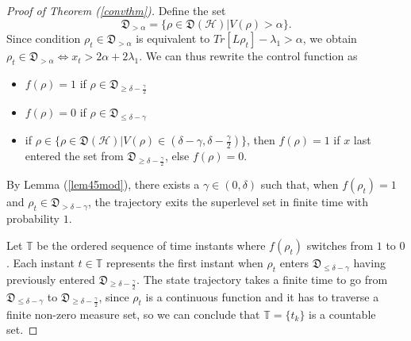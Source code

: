 \documentclass[conference]{IEEEtran}
\theoremstyle{plain}
\theoremstyle{plain}
\theoremstyle{plain}
\theoremstyle{plain}
\theoremstyle{remark}
\theoremstyle{definition}
\begin{document}
\begin{proof}[Proof of Theorem (\ref{convthm})]
    {Define the set \begin{equation}
        \mathfrak D_{> \alpha} = \{\rho \in \mathfrak{D}(\mathcal H) | V(\rho) > \alpha\}.
    \end{equation} Since condition $\rho_t \in \mathfrak D_{> \alpha}$ is equivalent to $Tr[L\rho_t] - \lambda_1 > \alpha$,  we obtain
\(
        \rho_t \in \mathfrak D_{> \alpha} \iff x_t > 2\alpha + 2\lambda_1.
 \)
     We can thus rewrite the control function as \begin{itemize}
        \item $f(\rho) = 1$ if $\rho \in \mathfrak D_{\ge \delta - \frac{\gamma}{2}}$
        \item $f(\rho) = 0$ if $\rho \in \mathfrak D_{\le \delta - \gamma}$
        \item if $\rho \in \{\rho \in \mathfrak D(\mathcal H) | V(\rho) \in (\delta - \gamma, \delta - \frac{\gamma}{2})\}$, then $f(\rho) = 1$ if $x$ last entered the set from $\mathfrak D_{\ge \delta - \frac{\gamma}{2}}$, else $f(\rho) = 0$.
    \end{itemize}}

    By Lemma (\ref{lem45mod}), there exists a $\gamma \in (0, \delta)$ such that, when $f(\rho_t) = 1$ and $\rho_t \in \mathfrak D_{> \delta - \gamma}$, the trajectory exits the superlevel set in finite time with probability $1$.

    Let $\mathbb T$ be the ordered sequence of time instants where $f(\rho_t)$ switches from $1$ to $0$. Each instant $t \in \mathbb T$ represents the first instant when $\rho_t$ enters $\mathfrak D_{\le \delta - \gamma}$ having previously entered $\mathfrak D_{\ge \delta - \frac{\gamma}{2}}$. The state trajectory takes a finite time to go from $\mathfrak D_{\le \delta - \gamma}$ to $\mathfrak D_{\ge \delta - \frac{\gamma}{2}}$, since $\rho_t$ is a continuous function and it has to traverse a finite non-zero measure set, so we can conclude that $\mathbb T = \{t_k\}$ is a countable set.


\end{proof}
\end{document}
